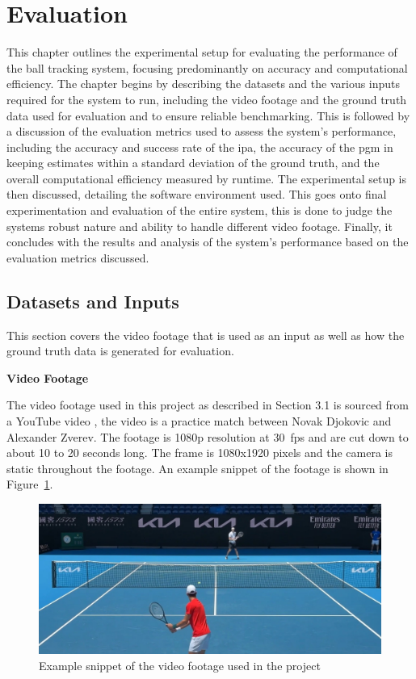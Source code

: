 \documentclass[12pt,a4paper]{article}
\begin{document}
\newpage
\section{Evaluation}
This chapter outlines the experimental setup for evaluating the performance of the ball tracking system, focusing predominantly on accuracy and computational efficiency. The chapter begins by describing the datasets and the various inputs required for the system to run, including the video footage and the ground truth data used for evaluation and to ensure reliable benchmarking. This is followed by a discussion of the evaluation metrics used to assess the system's performance, including the accuracy and success rate of the \acs{ipa}, the accuracy of the \acs{pgm} in keeping estimates within a standard deviation of the ground truth, and the overall computational efficiency measured by runtime. The experimental setup is then discussed, detailing the software environment used. This goes onto final experimentation and evaluation of the entire system, this is done to judge the systems robust nature and ability to handle different video footage. Finally, it concludes with the results and analysis of the system's performance based on the evaluation metrics discussed.

\subsection{Datasets and Inputs}
This section covers the video footage that is used as an input as well as how the ground truth data is generated for evaluation.

\textbf{Video Footage}

The video footage used in this project as described in Section 3.1 is sourced from a YouTube video \parencite{youtube_ZverevDjokovic}, the video is a practice match between Novak Djokovic and Alexander Zverev. The footage is 1080p resolution at 30~\acs{fps} and are cut down to about 10 to 20 seconds long. The frame is 1080x1920 pixels and the camera is static throughout the footage. An example snippet of the footage is shown in Figure~\ref{fig:footage}.

\begin{figure}[H]
	\centering
	\includegraphics[width=1\textwidth]{ZvDIn.jpg}
	\caption{Example snippet of the video footage used in the project}
	\label{fig:footage}
\end{figure}
\end{document}
